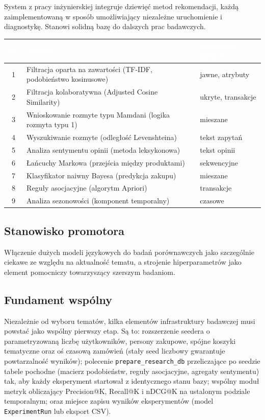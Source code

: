 \documentclass[12pt,a4paper]{article}
\begin{document}
System z pracy inżynierskiej integruje dziewięć metod rekomendacji, każdą zaimplementowaną w sposób umożliwiający niezależne uruchomienie i diagnostykę. Stanowi solidną bazę do dalszych prac badawczych.

\begin{tabularx}{\linewidth}{|c|X|l|}
\hline
\rowcolor{primary}
\textcolor{white}{\textbf{Lp.}} &
\textcolor{white}{\textbf{Metoda}} &
\textcolor{white}{\textbf{Charakter danych}} \\ \hline
1 & Filtracja oparta na zawartości (TF-IDF, podobieństwo kosinusowe) & jawne, atrybuty \\ \hline
2 & Filtracja kolaboratywna (Adjusted Cosine Similarity) & ukryte, transakcje \\ \hline
3 & Wnioskowanie rozmyte typu Mamdani (logika rozmyta typu 1) & mieszane \\ \hline
4 & Wyszukiwanie rozmyte (odległość Levenshteina) & tekst zapytań \\ \hline
5 & Analiza sentymentu opinii (metoda leksykonowa) & tekst opinii \\ \hline
6 & Łańcuchy Markowa (przejścia między produktami) & sekwencyjne \\ \hline
7 & Klasyfikator naiwny Bayesa (predykcja zakupu) & mieszane \\ \hline
8 & Reguły asocjacyjne (algorytm Apriori) & transakcje \\ \hline
9 & Analiza sezonowości (komponent temporalny) & czasowe \\ \hline
\end{tabularx}

\subsection*{Stanowisko promotora}

Włączenie dużych modeli językowych do badań porównawczych jako szczególnie ciekawe ze względu na aktualność tematu, a strojenie hiperparametrów jako element pomocniczy towarzyszący szerszym badaniom.

\subsection*{Fundament wspólny}

Niezależnie od wyboru tematów, kilka elementów infrastruktury badawczej musi powstać jako wspólny pierwszy etap. Są to: rozszerzenie seedera o parametryzowaną liczbę użytkowników, persony zakupowe, spójne koszyki tematyczne oraz oś czasową zamówień (stały seed liczbowy gwarantuje powtarzalność wyników); polecenie \texttt{prepare\_research\_db} przeliczające po seedzie tabele pochodne (macierz podobieństw, reguły asocjacyjne, agregaty sentymentu) tak, aby każdy eksperyment startował z identycznego stanu bazy; wspólny moduł metryk obliczający Precision@K, Recall@K i nDCG@K na ustalonym podziale temporalnym; oraz miejsce zapisu wyników eksperymentów (model \texttt{ExperimentRun} lub eksport CSV).
\end{document}
